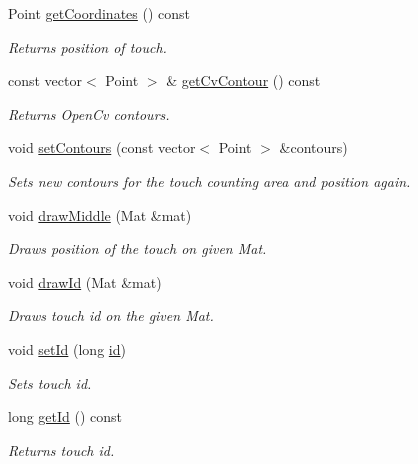 \begin{DoxyCompactItemize}
Point \hyperlink{class_touch_a5f8618fd8b3a27e6e3c6a4d40857f453}{getCoordinates} () const 
\begin{DoxyCompactList}\small\item\em Returns position of touch. \item\end{DoxyCompactList}\item 
const vector$<$ Point $>$ \& \hyperlink{class_touch_a4ca79d28c2e285266d28c0d8cdeb76af}{getCvContour} () const 
\begin{DoxyCompactList}\small\item\em Returns OpenCv contours. \item\end{DoxyCompactList}\item 
void \hyperlink{class_touch_ad6cdfe2dcf5a1165ce57cd04be78f8cf}{setContours} (const vector$<$ Point $>$ \&contours)
\begin{DoxyCompactList}\small\item\em Sets new contours for the touch counting area and position again. \item\end{DoxyCompactList}\item 
void \hyperlink{class_touch_a123a03234abf1ae816aea498e1d8d965}{drawMiddle} (Mat \&mat)
\begin{DoxyCompactList}\small\item\em Draws position of the touch on given Mat. \item\end{DoxyCompactList}\item 
void \hyperlink{class_touch_a9bd3abccb63bce8719e45a4b0810d466}{drawId} (Mat \&mat)
\begin{DoxyCompactList}\small\item\em Draws touch id on the given Mat. \item\end{DoxyCompactList}\item 
void \hyperlink{class_touch_abad54fe066c0914868289dc4c56d3006}{setId} (long \hyperlink{class_touch_ac21e0b89b6e9f809fde5353217519d75}{id})
\begin{DoxyCompactList}\small\item\em Sets touch id. \item\end{DoxyCompactList}\item 
long \hyperlink{class_touch_a25f437c8b324da3a116a0c6e7f60493f}{getId} () const 
\begin{DoxyCompactList}\small\item\em Returns touch id. \item\end{DoxyCompactList}\item 

\end{DoxyCompactItemize}
